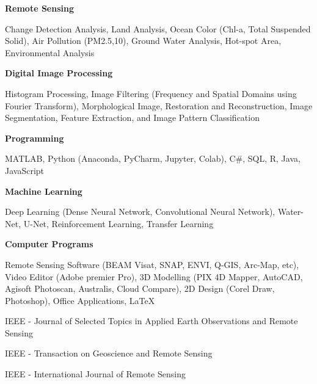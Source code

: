 \documentclass[
  a4paper, 
   maincolor=cvblue,
   sectioncolor=cvblue,
]{fortysecondscv}
\begin{document}
{\color{cvsectioncolor}\textbf{Remote Sensing}} %
\begin{itemize}
	{\small
	\item Change Detection Analysis, Land Analysis, Ocean Color (Chl-a, Total Suspended Solid), Air Pollution (PM2.5,10), Ground Water Analysis, Hot-spot Area, Environmental Analysis
	}
\end{itemize}
{\color{cvsectioncolor}\textbf{Digital Image Processing}} 
\begin{itemize}
	{\small
	\item Histogram Processing, Image Filtering (Frequency and Spatial Domains using Fourier Transform), Morphological Image, Restoration and Reconstruction, Image Segmentation, Feature Extraction, and Image Pattern Classification
	}
\end{itemize}
{\color{cvsectioncolor}\textbf{Programming}}
\begin{itemize}
	{\small
	\item MATLAB, Python (Anaconda, PyCharm, Jupyter, Colab), C\#, SQL, R, Java, JavaScript
	}
\end{itemize}
{\color{cvsectioncolor}\textbf{Machine Learning}}
\begin{itemize}
	{\small
	\item Deep Learning (Dense Neural Network, Convolutional Neural Network), Water-Net, U-Net, Reinforcement Learning, Transfer Learning
	}
\end{itemize}
{\color{cvsectioncolor}\textbf{Computer Programs}}
\begin{itemize}
	{\small
	\item Remote Sensing Software (BEAM Visat, SNAP, ENVI, Q-GIS, Arc-Map, etc), Video Editor (Adobe premier Pro), 3D Modelling (PIX 4D Mapper, AutoCAD, Agisoft Photoscan, Australis, Cloud Compare), 2D Design (Corel Draw, Photoshop), Office Applications, LaTeX
	}
\end{itemize}

\newpage
\makebacksidebar

\begin{itemize}
	{
	\item IEEE - Journal of Selected Topics in Applied Earth Observations and Remote Sensing
	\item IEEE - Transaction on Geoscience and Remote Sensing
	\item IEEE - International Journal of Remote Sensing
	}
\end{itemize}
\end{document}
